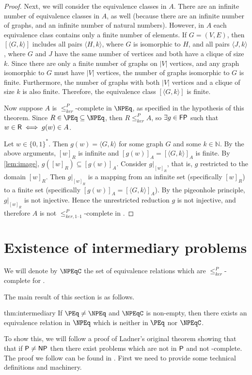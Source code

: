 \documentclass{article}
\theoremstyle{definition} \newtheorem{definition}[definition]{Definition}
\newcommand{\sigmastar}{\{0, 1\}^{*}} %
\newcommand{\kr}{\leq^{P}_{ker}} %
\newcommand{\kri}{\leq^{P}_{ker,1\text{--}1}} %
\newcommand{\pair}[2]{\langle#1,#2\rangle} %
\newcommand{\printintermediarytheorem}{If $\PEq\neq\NPEq$ and $\NPEqC$ is non-empty, then there exists an equivalence relation in $\NPEq$ which is neither in $\PEq$ nor $\NPEqC$.}
\begin{document}
\begin{proof}
  Next, we will consider the equivalence classes in $A$.
  There are an infinite number of equivalence classes in $A$, as well (because there are an infinite number of graphs, and an infinite number of natural numbers).
  However, in $A$ each equivalence class contains only a finite number of elements.
  If $G=(V,E)$, then $[\pair{G}{k}]$ includes all pairs $\pair{H}{k}$, where $G$ is isomorphic to $H$, and all pairs $\pair{J}{k}$, where $G$ and $J$ have the same number of vertices and both have a clique of size $k$.
  Since there are only a finite number of graphs on $|V|$ vertices, and any graph isomorphic to $G$ must have $|V|$ vertices, the number of graphs isomorphic to $G$ is finite.
  Furthermore, the number of graphs with both $|V|$ vertices and a clique of size $k$ is also finite.
  Therefore, the equivalence class $[\pair{G}{k}]$ is finite.

  Now suppose $A$ is $\kr$-complete in $\NPEq$, as specified in the hypothesis of this theorem.
  Since $R\in\PEq\subseteq\NPEq$, then $R\kr A$, so $\exists g\in\FP$ such that $w\in\R\iff g(w)\in A$.

  Let $w\in\sigmastar$.
  Then $g(w)=\pair{G}{k}$ for some graph $G$ and some $k\in\mathbb{N}$.
  By the above arguments, $[w]_R$ is infinite and $[g(w)]_A=[\pair{G}{k}]_A$ is finite.
  By \autoref{lem:image}, $g([w]_R)\subseteq [g(w)]_A$.
  Consider $g|_{[w]_R}$, that is, $g$ restricted to the domain $[w]_R$.
  Then $g|_{[w]_R}$ is a mapping from an infinite set (specifically $[w]_R$) to a finite set (specifically $[g(w)]_A=[\pair{G}{k}]_A$).
  By the pigeonhole principle, $g|_{[w]_R}$ is not injective.
  Hence the unrestricted reduction $g$ is not injective, and therefore $A$ is not $\kri$-complete in \NPEq.
\end{proof}

\section{Existence of intermediary problems}

We will denote by $\NPEqC$ the set of equivalence relations which are $\kr$-complete for \NPEq.

The main result of this section is as follows.
\begin{reptheorem}{thm:intermediary}
  \printintermediarytheorem
\end{reptheorem}
To show this, we will follow a proof of Ladner's original theorem showing that that if $\P\neq\NP$ then there exist problems which are not in $\P$ and not \NP-complete.
The proof we follow can be found in \cite{bdg95}.
First we need to provide some technical definitions and machinery.
\end{document}
